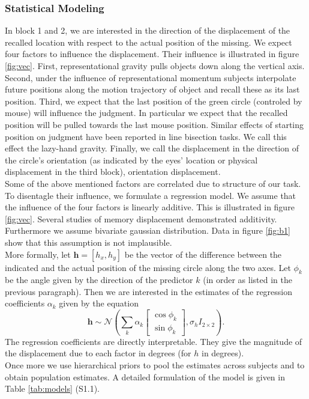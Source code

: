 \documentclass[10pt]{article}
\begin{document}
\subsubsection*{Statistical Modeling} 
In block 1 and 2, we are interested in the direction of the displacement of the recalled location with respect to the actual position of the missing. 
We expect four factors to influence the displacement. 
Their influence is illustrated in figure \ref{fig:vec}. 
First, representational gravity pulls objects down along the vertical axis. 
Second, under the influence of representational momentum subjects interpolate future positions along the motion trajectory of object and recall these as its last position. 
Third, we expect that the last position of the green circle (controled by mouse) will influence the judgment. 
In particular we expect that the recalled position will be pulled towards the last mouse position. 
Similar effects of starting position on judgment have been reported in line bisection tasks.%
We call this effect the lazy-hand gravity. 
Finally, we call the displacement in the direction of the circle's orientation (as indicated by the eyes' location or physical displacement in the third block), orientation displacement.\\
Some of the above mentioned factors are correlated due to structure of our task. 
To disentagle their influence, we formulate a regression model. 
We assume that the influence of the four factors is linearly additive. This is illustrated in figure \ref{fig:vec}. 
Several studies of memory displacement demonstrated additivity. %
Furthermore we assume bivariate gaussian distribution. 
Data in figure \ref{fig:b1} show that this assumption is not implausible.
\\ 
More formally, let $\mathbf h =[h_{x}, h_{y}]$ be the vector of the difference between the indicated and the actual position of the missing circle along the two axes. 
Let $\phi_{k}$ be the angle given by the direction of the predictor $k$ (in order as listed in the previous paragraph). 
Then we are interested in the estimates of the regression coefficients $\alpha_k$ given by the equation\\
\begin{equation}
\mathbf h \sim  \mathcal{N}\left(\sum_k \alpha_k \begin{bmatrix} \cos \phi_{k} \\ \sin \phi_{k} \end{bmatrix}, \sigma_h I_{2 \times 2} \right).
\end{equation} 
The regression coefficients are directly interpretable. 
They give the magnitude of the displacement due to each factor in degrees (for $h$ in degrees).
\\
Once more we use hierarchical priors to pool the estimates across subjects and to obtain population estimates. 
A detailed formulation of the model is given in Table \ref{tab:models} (S1.1).
\end{document}
